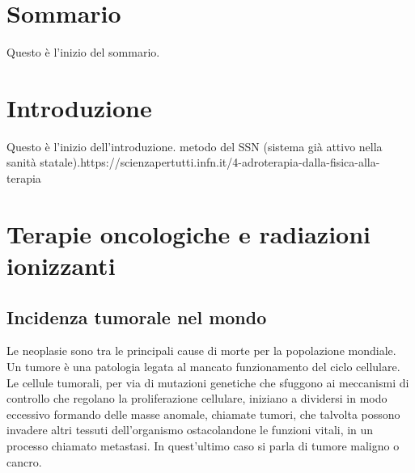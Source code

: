\documentclass[12pt,a4paper,twoside]{report}
\begin{document}
	\chapter*{Sommario}
		Questo è l'inizio del sommario.
	\newpage
	\tableofcontents
	\newpage
	\chapter*{Introduzione}
		Questo è l'inizio dell'introduzione. metodo del SSN (sistema già attivo nella sanità statale).https://scienzapertutti.infn.it/4-adroterapia-dalla-fisica-alla-terapia
	\newpage
	
	\chapter{Terapie oncologiche e radiazioni ionizzanti}
	\section{Incidenza tumorale nel mondo}
	Le neoplasie sono tra le principali cause di morte per la popolazione mondiale. Un tumore è una patologia legata al mancato funzionamento del ciclo cellulare. Le cellule tumorali, per via di mutazioni genetiche che sfuggono ai meccanismi di controllo che regolano la proliferazione cellulare, iniziano a dividersi in modo eccessivo formando delle masse anomale, chiamate tumori, che talvolta possono invadere altri tessuti dell'organismo ostacolandone le funzioni vitali, in un processo chiamato metastasi. In quest'ultimo caso si parla di tumore maligno o cancro.
		
\end{document}
